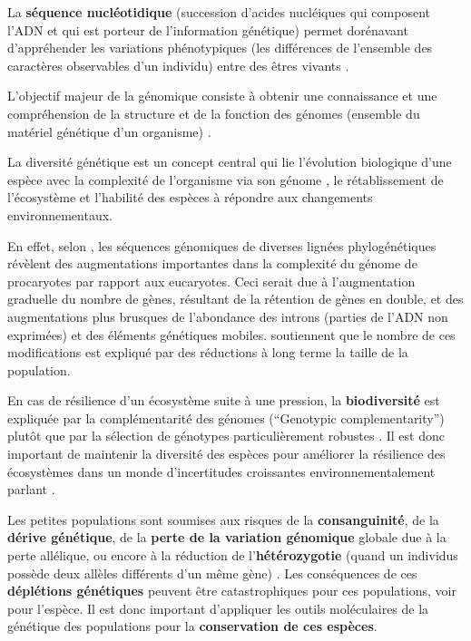 \documentclass[a4paper,11pt,twoside]{report}
\begin{document}
La \textbf{séquence nucléotidique} (succession d'acides nucléiques qui composent l'ADN et qui est porteur de l'information génétique) permet dorénavant d'appréhender les variations phénotypiques (les différences de l'ensemble des caractères observables d'un individu) entre des êtres vivants \citep{champe1962reversal}.

L'objectif majeur de la génomique consiste à obtenir une connaissance et une compréhension de la structure et de la fonction des génomes (ensemble du matériel génétique d'un organisme) \citep{eggen2003approches}.

La diversité génétique est un concept central qui lie l'évolution biologique d'une espèce avec la complexité de l'organisme via son génome \citep{lynch2003origins}, le rétablissement de l'écosystème \citep{reusch2005ecosystem} et l'habilité des espèces à répondre aux changements environnementaux\citep{o1994role}.

En effet, selon \citet{lynch2003origins}, les séquences génomiques de diverses lignées phylogénétiques révèlent des augmentations importantes dans la complexité du génome de procaryotes par rapport aux eucaryotes. Ceci serait due à l'augmentation graduelle du nombre de gènes, résultant de la rétention de gènes en double, et des augmentations plus brusques de l'abondance des introns (parties de l'ADN non exprimées) et des éléments génétiques mobiles. \citep{lynch2003origins} soutiennent que le nombre de ces modifications est expliqué par des réductions à long terme la taille de la population.

En cas de résilience d'un écosystème suite à une pression, la \textbf{biodiversité} est expliquée par la complémentarité des génomes (``Genotypic complementarity'') plutôt que par la sélection de génotypes particulièrement robustes \citep{reusch2005ecosystem}. Il est donc important de maintenir la diversité des espèces pour améliorer la résilience des écosystèmes dans un monde d'incertitudes croissantes environnementalement parlant \citep{reusch2005ecosystem}.

Les petites populations sont soumises aux risques de la \textbf{consanguinité}, de la \textbf{dérive génétique}, de la \textbf{perte de la variation génomique} globale due à la perte allélique, ou encore à la réduction de l'\textbf{hétérozygotie} (quand un individus possède deux allèles différents d'un même gène) \citep{o1994role}. Les conséquences de ces \textbf{déplétions génétiques} \citep{o1994role} peuvent être catastrophiques pour ces populations, voir pour l'espèce. Il est donc important d'appliquer les outils moléculaires de la génétique des populations pour la \textbf{conservation de ces espèces}.
\end{document}

